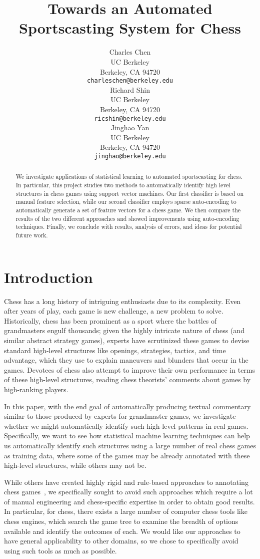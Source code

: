 \documentclass[11pt]{article}
\title{Towards an Automated Sportscasting System for Chess}
\author{
  Charles Chen \\
	UC Berkeley \\
	Berkeley, CA 94720 \\
  {\tt \small{charleschen@berkeley.edu}} \\
\And
  Richard Shin \\
	UC Berkeley \\
	Berkeley, CA 94720 \\
  {\tt \small{ricshin@berkeley.edu}} \\
\And
  Jinghao Yan \\
	UC Berkeley \\
	Berkeley, CA 94720 \\
  {\tt \small{jinghao@berkeley.edu}} \\
}
\begin{document}
\maketitle

\begin{abstract}
We investigate applications of statistical learning to automated 
sportscasting for chess. In particular, this project studies two methods 
to automatically identify high level structures in chess games using 
support vector machines. Our first classifier is based on manual feature 
selection, while our second classifier employs sparse auto-encoding to 
automatically generate a set of feature vectors for a chess game. We 
then compare the results of the two different approaches and showed 
improvements using auto-encoding techniques. Finally, we conclude with 
results, analysis of errors, and ideas for potential future work.
\end{abstract}

\section{Introduction}
Chess has a long history of intriguing enthusiasts due to its 
complexity. Even after years of play, each game is new challenge, a new 
problem to solve. Historically, chess has been prominent as a sport 
where the battles of grandmasters engulf thousands; given the highly 
intricate nature of chess (and similar abstract strategy games), experts 
have scrutinized these games to devise standard high-level structures 
like openings, strategies, tactics, and time advantage, which they use 
to explain maneuvers and blunders that occur in the games. Devotees of 
chess also attempt to improve their own performance in terms of these 
high-level structures, reading chess theorists' comments about games by 
high-ranking players. 

In this paper, with the end goal of automatically producing textual 
commentary similar to those produced by experts for grandmaster games, 
we investigate whether we might automatically identify such high-level 
patterns in real games. Specifically, we want to see how statistical 
machine learning techniques can help us automatically identify such 
structures using a large number of real chess games as training data, 
where some of the games may be already annotated with these high-level 
structures, while others may not be.

While others have created highly rigid and rule-based approaches to 
annotating chess games~\cite{cambridge-chess-annotation}, we 
specifically sought to avoid such approaches which require a lot of 
manual engineering and chess-specific expertise in order to obtain good 
results. In particular, for chess, there exists a large number of 
computer chess tools like chess engines, which search the game tree to 
examine the breadth of options available and identify the outcomes of 
each. We would like our approaches to have general applicability to 
other domains, so we chose to specifically avoid using such tools as 
much as possible. 
\end{document}
